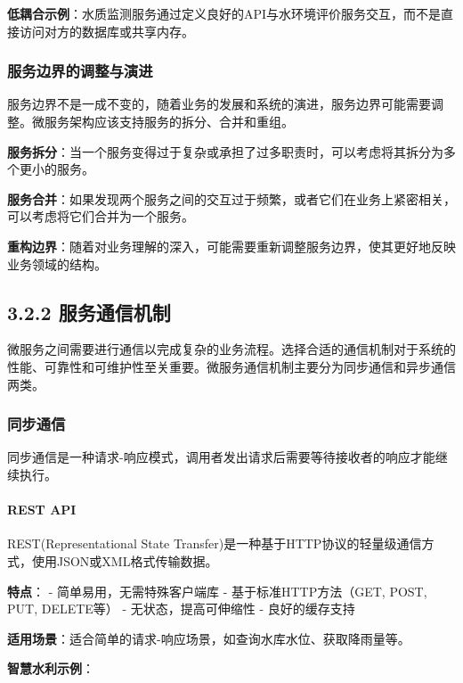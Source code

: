 \textbf{低耦合示例}：水质监测服务通过定义良好的API与水环境评价服务交互，而不是直接访问对方的数据库或共享内存。

\subsubsection{服务边界的调整与演进}\label{ux670dux52a1ux8fb9ux754cux7684ux8c03ux6574ux4e0eux6f14ux8fdb}

服务边界不是一成不变的，随着业务的发展和系统的演进，服务边界可能需要调整。微服务架构应该支持服务的拆分、合并和重组。

\textbf{服务拆分}：当一个服务变得过于复杂或承担了过多职责时，可以考虑将其拆分为多个更小的服务。

\textbf{服务合并}：如果发现两个服务之间的交互过于频繁，或者它们在业务上紧密相关，可以考虑将它们合并为一个服务。

\textbf{重构边界}：随着对业务理解的深入，可能需要重新调整服务边界，使其更好地反映业务领域的结构。

\subsection{3.2.2
服务通信机制}\label{ux670dux52a1ux901aux4fe1ux673aux5236}

微服务之间需要进行通信以完成复杂的业务流程。选择合适的通信机制对于系统的性能、可靠性和可维护性至关重要。微服务通信机制主要分为同步通信和异步通信两类。

\subsubsection{同步通信}\label{ux540cux6b65ux901aux4fe1}

同步通信是一种请求-响应模式，调用者发出请求后需要等待接收者的响应才能继续执行。

\paragraph{REST API}\label{rest-api}

REST(Representational State
Transfer)是一种基于HTTP协议的轻量级通信方式，使用JSON或XML格式传输数据。

\textbf{特点}： - 简单易用，无需特殊客户端库 - 基于标准HTTP方法（GET,
POST, PUT, DELETE等） - 无状态，提高可伸缩性 - 良好的缓存支持

\textbf{适用场景}：适合简单的请求-响应场景，如查询水库水位、获取降雨量等。

\textbf{智慧水利示例}：

